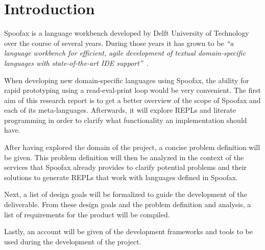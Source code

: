 \section*{Introduction}
\label{sec:introduction}

Spoofax is a language workbench developed by Delft University of Technology over
the course of several years. During those years it has grown to be \textit{``a
language workbench for efficient, agile development of textual domain-specific
languages with state-of-the-art IDE support''}~\cite{Kats10a}.

When developing new domain-specific languages using Spoofax, the ability for
rapid prototyping using a read-eval-print loop would be very convenient. The
first aim of this research report is to get a better overview of the scope of
Spoofax and each of its meta-languages. Afterwards, it will explore REPLs and
literate programming in order to clarify what functionality an
implementation should have.

After having explored the domain of the project, a concise problem definition
will be given. This problem definition will then be analyzed in the context of
the services that Spoofax already provides to clarify potential problems and
their solutions to generate REPLs that work with languages defined in Spoofax.

Next, a list of design goals will be formalized to guide the development of the
deliverable. From these design goals and the problem definition and analysis, a
list of requirements for the product will be compiled.

Lastly, an account will be given of the development frameworks and tools to be
used during the development of the project.

